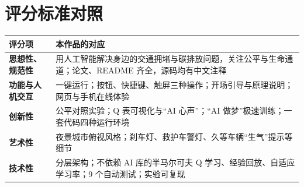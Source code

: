 \documentclass[UTF8,a4paper,zihao=-4,fontset=none]{ctexart}
\begin{document}
\section{评分标准对照}
\begin{center}\small
\begin{tabularx}{\linewidth}{>{\bfseries}l X}
\toprule
评分项 & 本作品的对应 \\
\midrule
思想性、规范性 & 用人工智能解决身边的交通拥堵与碳排放问题，关注公平与生命通道；论文、README 齐全，源码均有中文注释 \\
功能与人机交互 & 一键运行；按钮、快捷键、触屏三种操作；开场引导与原理说明；网页与手机在线体验 \\
创新性 & 公平对照实验；Q 表可视化与“AI 心声”；“AI 做梦”极速训练；一套代码四种运行环境 \\
艺术性 & 夜景城市俯视风格；刹车灯、救护车警灯、久等车辆“生气”提示等细节 \\
技术性 & 分层架构；不依赖 AI 库的半马尔可夫 Q 学习、经验回放、自适应学习率；9 个自动测试；实验可复现 \\
\bottomrule
\end{tabularx}
\end{center}
\end{document}

